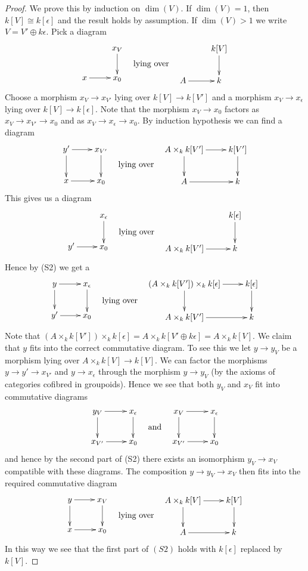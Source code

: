 \begin{proof}
We prove this by induction on $\dim(V)$. If $\dim(V) = 1$, then
$k[V] \cong k[\epsilon]$ and the result holds by assumption.
If $\dim(V) > 1$ we write $V = V' \oplus k\epsilon$. Pick a diagram
$$
\vcenter{
\xymatrix{
& x_V \ar[d] \\
x \ar[r] & x_0
}
}
\quad\text{lying over}\quad
\vcenter{
\xymatrix{
& k[V] \ar[d] \\
A \ar[r] & k
}
}
$$
Choose a morphism $x_V \to x_{V'}$ lying over $k[V] \to k[V']$
and a morphism $x_V \to x_\epsilon$ lying over $k[V] \to k[\epsilon]$.
Note that the morphism $x_V \to x_0$ factors as
$x_V \to x_{V'} \to x_0$ and as $x_V \to x_\epsilon \to x_0$.
By induction hypothesis we can find a diagram
$$
\vcenter{
\xymatrix{
y' \ar[d] \ar[r] & x_{V'} \ar[d] \\
x \ar[r] & x_0
}
}
\quad\text{lying over}\quad
\vcenter{
\xymatrix{
A \times_k k[V'] \ar[d] \ar[r] & k[V'] \ar[d] \\
A \ar[r] & k
}
}
$$
This gives us a diagram
$$
\vcenter{
\xymatrix{
& x_\epsilon \ar[d] \\
y' \ar[r] & x_0
}
}
\quad\text{lying over}\quad
\vcenter{
\xymatrix{
& k[\epsilon] \ar[d] \\
A \times_k k[V'] \ar[r] & k
}
}
$$
Hence by (S2) we get a
$$
\vcenter{
\xymatrix{
y \ar[d] \ar[r] & x_\epsilon \ar[d] \\
y' \ar[r] & x_0
}
}
\quad\text{lying over}\quad
\vcenter{
\xymatrix{
(A \times_k k[V']) \times_k k[\epsilon] \ar[d] \ar[r] & k[\epsilon] \ar[d] \\
A \times_k k[V'] \ar[r] & k
}
}
$$
Note that
$(A \times_k k[V']) \times_k k[\epsilon] = A \times_k k[V' \oplus k\epsilon]
= A \times_k k[V]$. We claim that $y$ fits into the correct commutative
diagram. To see this we let $y \to y_V$ be a morphism lying over
$A \times_k k[V] \to k[V]$. We can factor the morphisms
$y \to y' \to x_{V'}$ and $y \to x_\epsilon$ through the morphism
$y \to y_V$ (by the axioms of categories cofibred in groupoids).
Hence we see that both $y_V$ and $x_V$ fit into commutative diagrams
$$
\vcenter{
\xymatrix{
y_V \ar[r] \ar[d] & x_\epsilon \ar[d] \\
x_{V'} \ar[r]          & x_0
}
}
\quad\text{and}\quad
\vcenter{
\xymatrix{
x_V \ar[r] \ar[d] & x_\epsilon \ar[d] \\
x_{V'} \ar[r]                 & x_0
}
}
$$
and hence by the second part of (S2) there exists an isomorphism
$y_V \to x_V$ compatible with these diagrams. The composition
$y \to y_V \to x_V$ then fits into the required commutative diagram
$$
\vcenter{
\xymatrix{
y \ar[r] \ar[d] & x_V \ar[d] \\
x \ar[r] & x_0
}
}
\quad\text{lying over}\quad
\vcenter{
\xymatrix{
A \times_k k[V] \ar[d] \ar[r] & k[V] \ar[d] \\
A \ar[r] & k
}
}
$$
In this way we see that the first part of $(S2)$ holds with $k[\epsilon]$
replaced by $k[V]$.


\end{proof}
